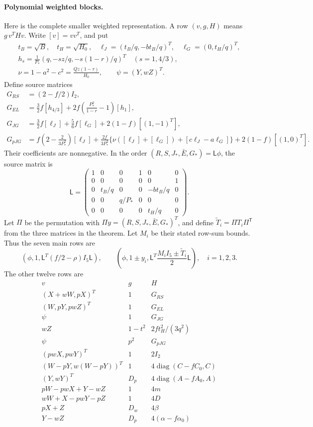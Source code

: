 \documentclass[11pt]{article}
\begin{document}
\paragraph{Polynomial weighted blocks.}
Here is the complete smaller weighted representation. A row
$(v,g,H)$ means $g\,v^THv$. Write $[v]=vv^T$, and put
\begin{gather*}
 t_B=\sqrt B,\quad t_H=\sqrt{H_0},\quad
 \ell_J=(t_B/q,-bt_B/q)^T,\quad \ell_G=(0,t_H/q)^T,\\
 h_s=\frac1{P_*}(q,-sz/q,-s(1-r)/q)^T\quad(s=1,4/3),\\
 \nu=1-a^2-c^2=\frac{Qz(1-r)}{H_0},\qquad \psi=(Y,wZ)^T.
\end{gather*}
Define source matrices
\begin{align*}
 G_{RS}&=(2-f/2)I_2,\\
 G_{EL}&=\tfrac32f[h_{4/3}]
               +2f\left(\frac{P_*^2}{1-r}-1\right)[h_1],\\
 G_{JG}&=\tfrac32f[\ell_J]+\tfrac56f[\ell_G]
                                      +2(1-f)[(1,-1)^T],\\
 G_{pJG}&=f\left(2-\frac2{3P_*^2}\right)[\ell_J]
       +\frac{2f}{3P_*^2}\{\nu([\ell_J]+[\ell_G])
                                      +[c\ell_J-a\ell_G]\}
       +2(1-f)[(1,0)^T].
\end{align*}
Their coefficients are nonnegative. In the order
$(R,S,J_*,\bar E,G_*)=\mathsf L\phi$, the source matrix is
\[
 \mathsf L=\begin{pmatrix}
 1&0&0&1&0&0\\0&0&0&0&0&1\\
 0&t_B/q&0&0&-bt_B/q&0\\
 0&0&q/P_*&0&0&0\\0&0&0&0&t_H/q&0
 \end{pmatrix}.
\]
Let $\Pi$ be the permutation with
$\Pi y=(R,S,J_*,\bar E,G_*)^T$, and define
$\widetilde T_i=\Pi T_i\Pi^{\mathsf T}$ from the three matrices
in the theorem. Let $M_i$ be their stated row-sum bounds.
Thus the seven main rows are
\[
 \left(\phi,1,\mathsf L^T(f/2-\rho)I_5\mathsf L\right),\qquad
 \left(\phi,1\pm y_i,
              \mathsf L^T\frac{M_iI_5\pm\widetilde T_i}{2}\mathsf L\right),
 \quad i=1,2,3.
\]
The other twelve rows are
\[
\begin{array}{c|c|c}
 v&g&H\\\hline
 (X+wW,pX)^T&1&G_{RS}\\
 (W,pY,pwZ)^T&1&G_{EL}\\
 \psi&1&G_{JG}\\
 wZ&1-t^2&2ft_H^2/(3q^2)\\
 \psi&p^2&G_{pJG}\\
 (pwX,pwY)^T&1&2I_2\\
 (W-pY,w(W-pY))^T&1&4\operatorname{diag}(C-fC_0,C)\\
 (Y,wY)^T&D_p&4\operatorname{diag}(A-fA_0,A)\\
 pW-pwX+Y-wZ&1&4m\\
 wW+X-pwY-pZ&1&4D\\
 pX+Z&D_w&4\beta\\
 Y-wZ&D_p&4(\alpha-f\alpha_0)
\end{array}
\]
\end{document}
